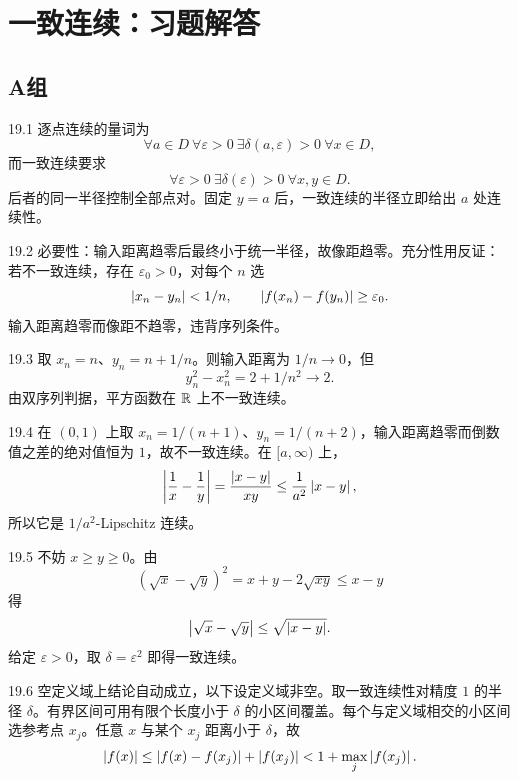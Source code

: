\chapter{一致连续：习题解答}

\section*{A组}

\begin{solution}{19.1}
逐点连续的量词为
\[
 \forall a\in D\ \forall\varepsilon>0\ \exists\delta(a,\varepsilon)>0
\ \forall x\in D,
\]
而一致连续要求
\[
 \forall\varepsilon>0\ \exists\delta(\varepsilon)>0
\ \forall x,y\in D.
\]
后者的同一半径控制全部点对。固定 \(y=a\) 后，一致连续的半径立即给出 \(a\) 处连续性。
\end{solution}

\begin{solution}{19.2}
必要性：输入距离趋零后最终小于统一半径，故像距趋零。充分性用反证：若不一致连续，存在 \(\varepsilon_0>0\)，对每个 \(n\) 选
\[
 \left|x_n-y_n\right|<1/n,\qquad
 \left|f(x_n)-f(y_n)\right|\ge\varepsilon_0.
\]
输入距离趋零而像距不趋零，违背序列条件。
\end{solution}

\begin{solution}{19.3}
取 \(x_n=n\)、\(y_n=n+1/n\)。则输入距离为 \(1/n\to0\)，但
\[
 y_n^2-x_n^2=2+1/n^2\to2.
\]
由双序列判据，平方函数在 \(\mathbb{R}\) 上不一致连续。
\end{solution}

\begin{solution}{19.4}
在 \((0,1)\) 上取 \(x_n=1/(n+1)\)、\(y_n=1/(n+2)\)，输入距离趋零而倒数值之差的绝对值恒为 \(1\)，故不一致连续。在 \([a,\infty)\) 上，
\[
 \left|\frac1x-\frac1y\right|
 =\frac{\left|x-y\right|}{xy}
 \le\frac1{a^2}\left|x-y\right|,
\]
所以它是 \(1/a^2\)-Lipschitz 连续。
\end{solution}

\begin{solution}{19.5}
不妨 \(x\ge y\ge0\)。由
\[
 (\sqrt x-\sqrt y)^2
 =x+y-2\sqrt{xy}\le x-y
\]
得
\[
 \left|\sqrt x-\sqrt y\right|\le\sqrt{\left|x-y\right|}.
\]
给定 \(\varepsilon>0\)，取 \(\delta=\varepsilon^2\) 即得一致连续。
\end{solution}

\begin{solution}{19.6}
空定义域上结论自动成立，以下设定义域非空。取一致连续性对精度 \(1\) 的半径 \(\delta\)。有界区间可用有限个长度小于 \(\delta\) 的小区间覆盖。每个与定义域相交的小区间选参考点 \(x_j\)。任意 \(x\) 与某个 \(x_j\) 距离小于 \(\delta\)，故
\[
 \left|f(x)\right|\le\left|f(x)-f(x_j)\right|+\left|f(x_j)\right|
 <1+\max_j\left|f(x_j)\right|.
\]
\end{solution}

